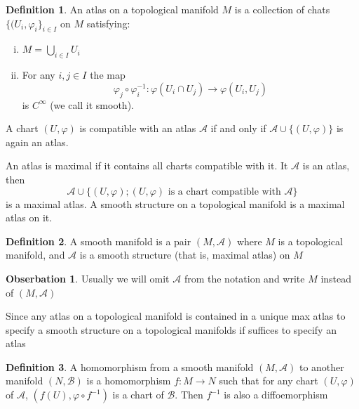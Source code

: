 \documentclass[]{book}
\theoremstyle{definition}
\newtheorem{defin}{Definition}[section]
\theoremstyle{definition}
\theoremstyle{definition}
\theoremstyle{definition}
\theoremstyle{definition}
\theoremstyle{definition}
\theoremstyle{definition}
\newtheorem*{obs}{Obserbation}
\theoremstyle{definition}
\theoremstyle{definition}
\theoremstyle{definition}
\theoremstyle{definition}
\begin{document}
\begin{defin}
  An atlas on a topological manifold $M$ is a collection of chats $\lbrace (U_i,\varphi_i
  \rbrace_{i\in I} $ on $M$ satisfying:
  \begin{enumerate}[i)]
    \item $M=\bigcup_{i\in I}^{} U_{i}$
    \item For any $i,j\in I$ the map
      \[
        \varphi_j\circ \varphi_i^{-1}:\varphi(U_i \cap U_j) \longrightarrow  \varphi(U_i,U_j)
      \] 
      is $C^{\infty}$ (we call it smooth).
  \end{enumerate}
\end{defin}

\begin{center}
\end{center}
A chart $(U,\varphi)$ is compatible with an atlas $\mathcal{A}$ if and only if $\mathcal{A}\cup
\lbrace (U,\varphi) \rbrace $ is again an atlas.

An atlas is maximal if it contains all charts compatible with it. It $\mathcal{A}$ is an atlas,
then
\[
\mathcal{A}\cup \lbrace (U,\varphi);(U,\varphi) \text{ is a chart compatible with $\mathcal{A}$} \rbrace 
\] 
is a maximal atlas. A smooth structure on a topological manifold is a maximal atlas on it.

\begin{defin}
  A smooth manifold is a pair $(M,\mathcal{A})$ where $M$ is a topological manifold, and
  $\mathcal{A}$ is a smooth structure (that is, maximal atlas) on $M$
\end{defin}

\begin{obs}
  Usually we will omit $\mathcal{A}$ from the notation and write $M$ instead of $(M,\mathcal{A})$			
\end{obs}

Since any atlas on a topological manifold is contained in a unique max atlas to specify a smooth
structure on a topological manifolds if suffices to specify an atlas

\begin{defin}
  A homomorphism from a smooth manifold $(M,\mathcal{A})$ to another manifold $(N,\mathcal{B})$ is
  a homomorphism $f:M\longrightarrow N $ such that for any chart $(U,\varphi)$ of $\mathcal{A}$,
  $(f(U),\varphi\circ f^{-1})$ is a chart of $\mathcal{B}$. Then $f^{-1}$ is also a diffoemorphism
\end{defin}
\end{document}

